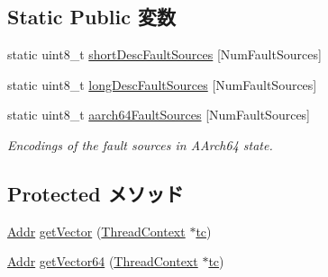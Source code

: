 \subsection*{Static Public 変数}
\begin{DoxyCompactItemize}
\item 
static uint8\_\-t \hyperlink{classArmISA_1_1ArmFault_a9d1adbbd4c90a71fbe8e091316ddad20}{shortDescFaultSources} \mbox{[}NumFaultSources\mbox{]}
\item 
static uint8\_\-t \hyperlink{classArmISA_1_1ArmFault_af8144bca69405c504518999a068fe715}{longDescFaultSources} \mbox{[}NumFaultSources\mbox{]}
\item 
static uint8\_\-t \hyperlink{classArmISA_1_1ArmFault_a9717d5a209bf4c9a1c0641374bba08d6}{aarch64FaultSources} \mbox{[}NumFaultSources\mbox{]}
\begin{DoxyCompactList}\small\item\em Encodings of the fault sources in AArch64 state. \item\end{DoxyCompactList}\end{DoxyCompactItemize}
\subsection*{Protected メソッド}
\begin{DoxyCompactItemize}
\item 
\hyperlink{classm5_1_1params_1_1Addr}{Addr} \hyperlink{classArmISA_1_1ArmFault_a27f212dcc968f825450c87cfbc39eb37}{getVector} (\hyperlink{classThreadContext}{ThreadContext} $\ast$\hyperlink{namespaceArmISA_a5aff829af55e65b802d83dfcef4e9dd0}{tc})
\item 
\hyperlink{classm5_1_1params_1_1Addr}{Addr} \hyperlink{classArmISA_1_1ArmFault_add9243269fc0ab1dca2ea804c7fa2600}{getVector64} (\hyperlink{classThreadContext}{ThreadContext} $\ast$\hyperlink{namespaceArmISA_a5aff829af55e65b802d83dfcef4e9dd0}{tc})
\end{DoxyCompactItemize}

